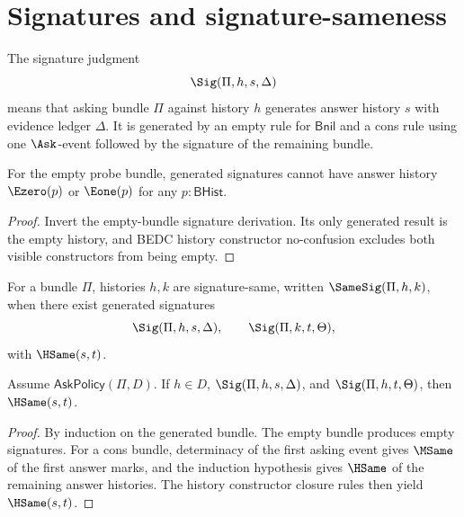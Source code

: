 \section{Signatures and signature-sameness}

\begin{definition}
\label{def:proof-sprint-generated-signature}
The signature judgment
$$
\Sig(\Pi,h,s,\Delta)
$$
means that asking bundle \(\Pi\) against history \(h\) generates answer history \(s\) with evidence ledger \(\Delta\).  It is generated by an empty rule for \(\mathsf{Bnil}\) and a cons rule using one \(\Ask\)-event followed by the signature of the remaining bundle.
\end{definition}

\begin{theorem}
\label{thm:sig-empty-visible-absurd}
For the empty probe bundle, generated signatures cannot have answer history
\(\Ezero(p)\) or \(\Eone(p)\) for any \(p:\mathsf{BHist}\).
\end{theorem}
\begin{proof}
Invert the empty-bundle signature derivation.  Its only generated result is the
empty history, and BEDC history constructor no-confusion excludes both visible
constructors from being empty.
\end{proof}

\begin{definition}
For a bundle \(\Pi\), histories \(h,k\) are signature-same, written \(\SameSig(\Pi,h,k)\), when there exist generated signatures
$$
\Sig(\Pi,h,s,\Delta),
\qquad
\Sig(\Pi,k,t,\Theta),
$$
with \(\HSame(s,t)\).
\end{definition}

\begin{theorem}
\label{thm:proof-sprint-signature-determinacy-under-policy}
Assume \(\mathsf{AskPolicy}(\Pi,D)\).  If \(h\in D\), \(\Sig(\Pi,h,s,\Delta)\), and \(\Sig(\Pi,h,t,\Theta)\), then \(\HSame(s,t)\).
\end{theorem}
\begin{proof}
By induction on the generated bundle.  The empty bundle produces empty signatures.  For a cons bundle, determinacy of the first asking event gives \(\MSame\) of the first answer marks, and the induction hypothesis gives \(\HSame\) of the remaining answer histories.  The history constructor closure rules then yield \(\HSame(s,t)\).
\end{proof}

